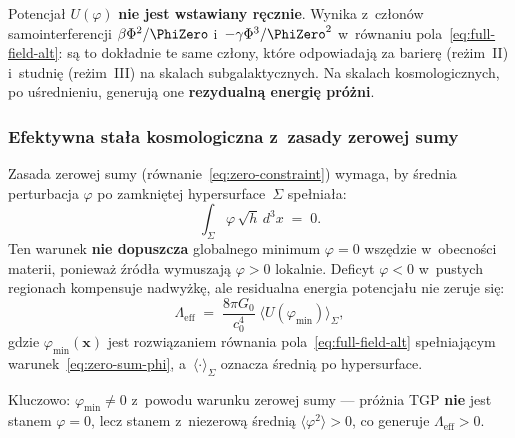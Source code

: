 \begin{remark}
Potencja\l{} $U(\varphi)$ \textbf{nie jest wstawiany r\k{e}cznie}.
Wynika z~cz\l{}on\'ow samointerferencji $\beta\Phi^2/\PhiZero$
i~$-\gamma\Phi^3/\PhiZero^2$
w~r\'ownaniu pola~\eqref{eq:full-field-alt}: s\k{a} to dok\l{}adnie
te same cz\l{}ony, kt\'ore odpowiadaj\k{a} za barier\k{e} (re\.zim~II)
i~studni\k{e} (re\.zim~III) na skalach subgalaktycznych. Na skalach
kosmologicznych, po u\'srednieniu, generuj\k{a} one
\textbf{rezydualn\k{a} energi\k{e} pr\'o\.zni}.
\end{remark}

\subsubsection{Efektywna sta\l{}a kosmologiczna z~zasady zerowej sumy}

\begin{proposition}\label{prop:Lambda-positive}
Zasada zerowej sumy (r\'ownanie~\ref{eq:zero-constraint})
wymaga, by \'srednia perturbacja $\varphi$ po zamkni\k{e}tej
hypersurface~$\Sigma$ spe\l{}nia\l{}a:
\begin{equation}\label{eq:zero-sum-phi}
    \int_\Sigma \varphi\,\sqrt{h}\,d^3x \;=\; 0.
\end{equation}
Ten warunek \textbf{nie dopuszcza} globalnego minimum
$\varphi = 0$ wsz\k{e}dzie w~obecno\'sci materii, poniewa\.z
\'zr\'od\l{}a wymuszaj\k{a} $\varphi > 0$ lokalnie. Deficyt
$\varphi < 0$ w~pustych regionach kompensuje nadwy\.zk\k{e},
ale residualna energia potencja\l{}u nie zeruje si\k{e}:
\begin{equation}\label{eq:Lambda-eff-def}
  \boxed{
    \Lambda_{\mathrm{eff}}
    \;=\; \frac{8\pi G_0}{c_0^4}\;
    \bigl\langle U(\varphi_{\min}) \bigr\rangle_\Sigma,
  }
\end{equation}
gdzie $\varphi_{\min}(\mathbf{x})$ jest rozwi\k{a}zaniem
r\'ownania pola~\eqref{eq:full-field-alt} spe\l{}niaj\k{a}cym
warunek~\eqref{eq:zero-sum-phi}, a~$\langle\cdot\rangle_\Sigma$
oznacza \'sredni\k{a} po hypersurface.

Kluczowo: $\varphi_{\min} \neq 0$ z~powodu warunku
zerowej sumy --- pr\'o\.znia TGP \textbf{nie} jest stanem
$\varphi = 0$, lecz stanem z~niezerow\k{a}
\'sredni\k{a} $\langle\varphi^2\rangle > 0$, co generuje
$\Lambda_{\mathrm{eff}} > 0$.
\end{proposition}

